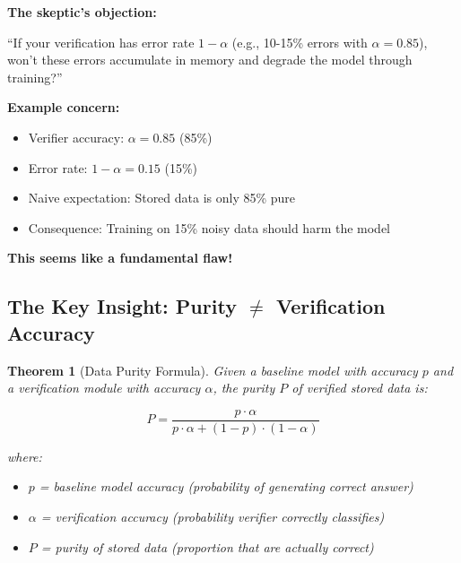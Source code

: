 \documentclass[12pt,a4paper]{article}
\newtheorem{theorem}{Theorem}[section]
\theoremstyle{definition}
\begin{document}
\begin{problembox}
\textbf{The skeptic's objection:}

``If your verification has error rate $1-\alpha$ (e.g., 10-15\% errors with $\alpha=0.85$), won't these errors accumulate in memory and degrade the model through training?''

\textbf{Example concern:}
\begin{itemize}
    \item Verifier accuracy: $\alpha = 0.85$ (85\%)
    \item Error rate: $1-\alpha = 0.15$ (15\%)
    \item Naive expectation: Stored data is only 85\% pure
    \item Consequence: Training on 15\% noisy data should harm the model
\end{itemize}

\textbf{This seems like a fundamental flaw!}
\end{problembox}

\subsection{The Key Insight: Purity $\neq$ Verification Accuracy}

\begin{theorem}[Data Purity Formula]
\label{thm:purity}
Given a baseline model with accuracy $p$ and a verification module with accuracy $\alpha$, the purity $P$ of verified stored data is:

\begin{equation}
P = \frac{p \cdot \alpha}{p \cdot \alpha + (1-p) \cdot (1-\alpha)}
\end{equation}

where:
\begin{itemize}
    \item $p$ = baseline model accuracy (probability of generating correct answer)
    \item $\alpha$ = verification accuracy (probability verifier correctly classifies)
    \item $P$ = purity of stored data (proportion that are actually correct)
\end{itemize}
\end{theorem}
\end{document}
